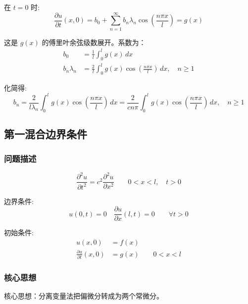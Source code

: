 \documentclass[a4paper, 12pt, oneside]{article} %
\numberwithin{subsection}{section}
\numberwithin{subsubsection}{subsection}
\theoremstyle{plain}
\theoremstyle{definition}
\theoremstyle{remark}
\begin{document}
		在 \(t = 0\) 时:
		\begin{equation}
			\frac{\partial u}{\partial t}(x, 0) = b_0 + \sum_{n=1}^{\infty} b_n \lambda_n \cos\left(\frac{n\pi x}{l}\right) = g(x)
		\end{equation}
		
		这是 $g(x)$ 的傅里叶余弦级数展开。系数为：
		\begin{align}
			b_0 &= \frac{1}{l} \int_0^l g(x) \, dx \\
			b_n \lambda_n &= \frac{2}{l} \int_0^l g(x) \cos\left(\frac{n\pi x}{l}\right) \, dx, \quad n \ge 1
		\end{align}
		
		化简得:
		\begin{equation}
			b_n = \frac{2}{l \lambda_n} \int_0^l g(x) \cos\left(\frac{n\pi x}{l}\right) \, dx = \frac{2}{cn\pi} \int_0^l g(x) \cos\left(\frac{n\pi x}{l}\right) \, dx, \quad n \ge 1
		\end{equation}
		
		
		\subsection{第一混合边界条件}
		
		\subsubsection{问题描述}
		\begin{equation} \label{eq:wave_equation_mixed1}
			\frac{\partial^2 u}{\partial t^2} = c^2 \frac{\partial^2 u}{\partial x^2} \qquad 0 < x < l, \quad t > 0
		\end{equation}
		
		边界条件:
		\begin{equation} \label{eq:boundary_conditions_mixed1}
			u(0, t) = 0 \quad \frac{\partial u}{\partial x}(l, t) = 0 \qquad \forall t > 0
		\end{equation}
		
		初始条件:
		\begin{equation} \label{eq:initial_conditions_mixed1}
			\begin{aligned}
				u(x, 0) &= f(x) \\
				\frac{\partial u}{\partial t}(x, 0) &= g(x) \qquad 0 < x < l
			\end{aligned}
		\end{equation}
		
		\subsubsection{核心思想}
		核心思想：分离变量法把偏微分转成为两个常微分。
		
\end{document}
